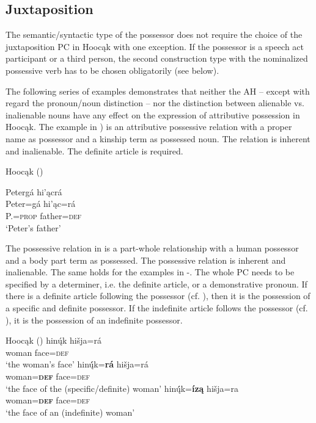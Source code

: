 \documentclass[output=paper]{LSP/langsci}
\begin{document}
\subsection{Juxtaposition}\label{sec:helmbrecht:3.1}

The semantic/syntactic type of the possessor does not require the choice of the juxtaposition PC in Hoocąk with one exception. If the possessor is a speech act participant or a third person, the second construction type with the nominalized possessive verb has to be chosen obligatorily (see  below).

The following series of examples demonstrates that neither the AH – except with regard the pronoun/noun distinction – nor the distinction between alienable vs. inalienable nouns have any effect on the expression of attributive possession in Hoocąk. The example in ) is an attributive possessive relation with a proper name as possessor and a kinship term as possessed noun. The relation is inherent and inalienable. The definite article is required.

\ea Hoocąk (\citealt[16]{Helmbrecht2003}) \label{petersfather}

\glll Petergá hi'\k{a}crá\\
Peter=gá       hi'\k{a}c=rá \\
  P.=\textsc{prop} father=\textsc{def} \\
\glt`Peter's father'
\z

The possessive relation in  is a part-whole relationship with a human possessor and a body part term as possessed. The possessive relation is inherent and inalienable. The same holds for the examples in -. The whole PC needs to be specified by a determiner, i.e. the definite article, or a demonstrative pronoun. If there is a definite article following the possessor (cf. ), then it is the possession of a specific and definite possessor. If the indefinite article follows the possessor (cf. ), it is the possession of an indefinite possessor. 

\ea Hoocąk (\citealt[13]{Helmbrecht2003})\label{womansface}
\ea \label{womansfacea}
\gll hinų́k    hišja=rá \\
woman face=\textsc{def} \\
\glt `the woman's face'
\ex\label{womansfaceb}
\gll hinų́́k=\textbf{rá}         hišja=rá \\
woman=\textbf{\textsc{def}} face=\textsc{def} \\
\trans `the face of the (specific/definite) woman'
\ex\label{womansfacec}
\gll hinų́́k=\textbf{íz\k{a}} hišja=ra \\
woman=\textbf{\textsc{def}}  face=\textsc{def} \\ 
\glt `the face of an (indefinite) woman'
\z
\z
\end{document}
